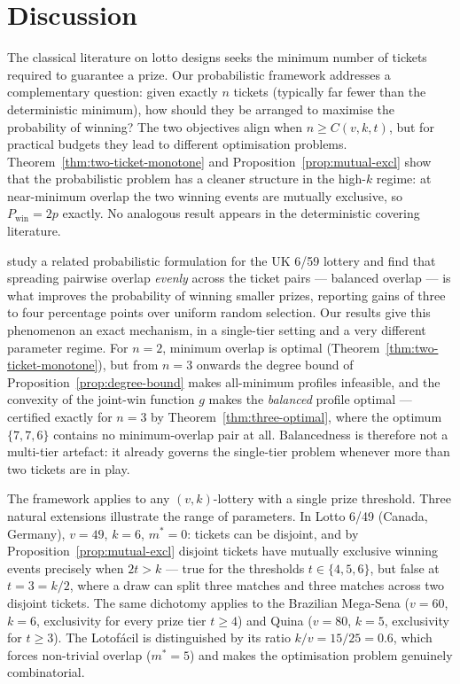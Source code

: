 
\section{Discussion}
\label{sec:discussion}

The classical literature on lotto designs \cite{Furedi1996, Li2002,
Gordon1995} seeks the minimum number of tickets required to guarantee a
prize.  Our probabilistic framework addresses a complementary question:
given exactly $n$ tickets (typically far fewer than the deterministic
minimum), how should they be arranged to maximise the probability of
winning?  The two objectives align when $n \ge C(v,k,t)$, but for practical
budgets they lead to different optimisation problems.  Theorem~\ref{thm:two-ticket-monotone}
and Proposition~\ref{prop:mutual-excl} show that the probabilistic problem
has a cleaner structure in the high-$k$ regime: at near-minimum overlap the
two winning events are mutually exclusive, so $P_{\mathrm{win}} = 2p$
exactly.  No analogous result appears in the deterministic covering literature.

\citet{Liu2024} study a related probabilistic formulation for the UK 6/59
lottery and find that spreading pairwise overlap \emph{evenly} across the
ticket pairs --- balanced overlap --- is what improves the probability of
winning smaller prizes, reporting gains of three to four percentage points
over uniform random selection.  Our results give this phenomenon an exact
mechanism, in a single-tier setting and a very different parameter regime.
For $n = 2$, minimum overlap is optimal
(Theorem~\ref{thm:two-ticket-monotone}), but from $n = 3$ onwards the
degree bound of Proposition~\ref{prop:degree-bound} makes all-minimum
profiles infeasible, and the convexity of the joint-win function $g$ makes
the \emph{balanced} profile optimal --- certified exactly for $n = 3$ by
Theorem~\ref{thm:three-optimal}, where the optimum $\{7,7,6\}$ contains no
minimum-overlap pair at all.  Balancedness is therefore not a multi-tier
artefact: it already governs the single-tier problem whenever more than
two tickets are in play.

The framework applies to any $(v,k)$-lottery with a single prize threshold.
Three natural extensions illustrate the range of parameters.  In Lotto 6/49
(Canada, Germany), $v=49$, $k=6$, $m^*=0$: tickets can be disjoint, and by
Proposition~\ref{prop:mutual-excl} disjoint tickets have mutually exclusive
winning events precisely when $2t > k$ --- true for the thresholds
$t \in \{4,5,6\}$, but false at $t = 3 = k/2$, where a draw can split three
matches and three matches across two disjoint tickets.  The same dichotomy
applies to the Brazilian Mega-Sena ($v=60$, $k=6$, exclusivity for every
prize tier $t \ge 4$) and Quina ($v=80$, $k=5$, exclusivity for $t \ge 3$).
The Lotof\'{a}cil is distinguished by its ratio $k/v = 15/25 = 0.6$, which
forces non-trivial overlap ($m^* = 5$) and makes the optimisation problem
genuinely combinatorial.

